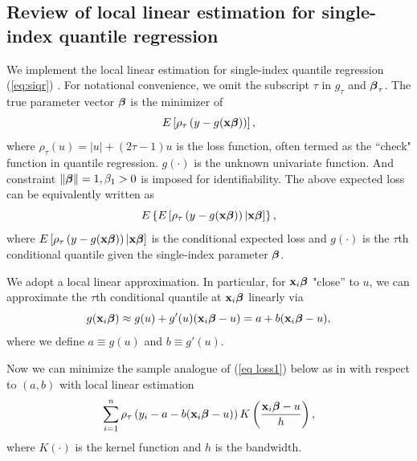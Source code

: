 \subsection{Review of local linear estimation for single-index quantile regression} \label{sec:single-index model}

We implement the local linear estimation for single-index quantile regression (\ref{eq:siqr}) \citep{wu_single-index_2010}. For notational convenience, we omit the subscript $\tau$ in $g_\tau$ and $\mbox{\boldmath$\beta$}_{\tau}$. The true parameter vector $\mbox{\boldmath$\beta$}$ is the minimizer of
\begin{equation}\label{eq loss1}
 E\left[\rho_\tau\left(y-g({\bf x}\mbox{\boldmath$\beta$})\right)\right] ,
\end{equation}
where $\rho_\tau(u)=|u|+(2\tau-1)u$ is
the loss function, often termed as the ``check" function in quantile regression. $g(\cdot)$ is the unknown univariate function. And constraint $\|\mbox{\boldmath$\beta$}\|=1, \beta_1>0$ is imposed for identifiability. The above expected loss can be equivalently written as
\begin{equation}\label{eq loss2}
E\left\{E\left[\rho_\tau\left(y-g({\bf x}\mbox{\boldmath$\beta$})\right)|{\bf x}\mbox{\boldmath$\beta$}\right]\right\}, \end{equation}  where $E\left[\rho_\tau\left(y-g({\bf x}\mbox{\boldmath$\beta$})\right)|{\bf x}\mbox{\boldmath$\beta$}\right]$ is the conditional expected loss and $g(\cdot)$ is the $\tau$th conditional quantile given the single-index parameter $\mbox{\boldmath$\beta$}$.

We adopt a local linear approximation. In particular, for ${\bf x}_i\mbox{\boldmath$\beta$}$ "close'' to $u$, we can approximate the $\tau$th conditional quantile at ${\bf x}_i\mbox{\boldmath$\beta$}$ linearly via
\begin{equation*} 
g({\bf x}_i\mbox{\boldmath$\beta$})\approx g(u)+g'(u)({\bf x}_i\mbox{\boldmath$\beta$}-u)=a+b({\bf x}_i\mbox{\boldmath$\beta$}-u),
\end{equation*}
where we define $a{\equiv}g(u)$ and $b{\equiv}g'(u)$.

Now we can minimize the sample analogue of (\ref{eq loss1}) below as in \cite{yu_local_1998} with respect to $(a, b)$ with local linear estimation
\begin{equation}\label{eq condloss}\sum_{i=1}^n\rho_\tau\left(y_i-a-b({\bf x}_i\mbox{\boldmath$\beta$}-u)\right)K\left(\frac{{\bf x}_i\mbox{\boldmath$\beta$}-u}{h}\right),
\end{equation}
where $K(\cdot)$ is the kernel function and $h$ is the bandwidth.

